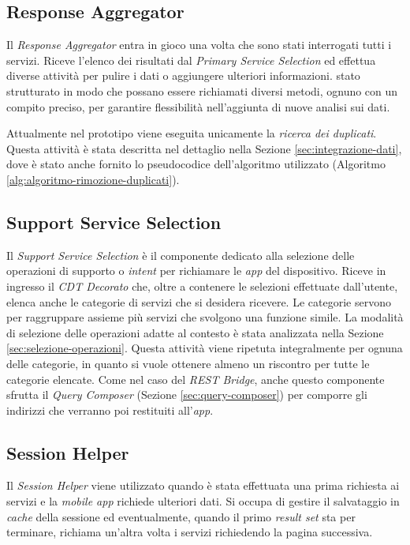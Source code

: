 \subsection{Response Aggregator\label{sec:response-aggregator}}

Il \emph{Response Aggregator} entra in gioco una volta che sono stati interrogati tutti i servizi. Riceve l'elenco dei risultati dal \emph{Primary Service Selection} ed effettua diverse attività per pulire i dati o aggiungere ulteriori informazioni. \upe stato strutturato in modo che possano essere richiamati diversi metodi, ognuno con un compito preciso, per garantire flessibilità nell'aggiunta di nuove analisi sui dati.

Attualmente nel prototipo viene eseguita unicamente la \emph{ricerca dei duplicati}. Questa attività è stata descritta nel dettaglio nella Sezione \ref{sec:integrazione-dati}, dove è stato anche fornito lo pseudocodice dell'algoritmo utilizzato (Algoritmo \ref{alg:algoritmo-rimozione-duplicati}).

\subsection{Support Service Selection\label{sec:support-service-selection}}

Il \emph{Support Service Selection} è il componente dedicato alla selezione delle operazioni di supporto o \emph{intent} per richiamare le \emph{app} del dispositivo. Riceve in ingresso il \emph{CDT Decorato} che, oltre a contenere le selezioni effettuate dall'utente, elenca anche le categorie di servizi che si desidera ricevere. Le categorie servono per raggruppare assieme più servizi che svolgono una funzione simile. La modalità di selezione delle operazioni adatte al contesto è stata analizzata nella Sezione \ref{sec:selezione-operazioni}. Questa attività viene ripetuta integralmente per ognuna delle categorie, in quanto si vuole ottenere almeno un riscontro per tutte le categorie elencate. Come nel caso del \emph{REST Bridge}, anche questo componente sfrutta il \emph{Query Composer} (Sezione \ref{sec:query-composer}) per comporre gli indirizzi che verranno poi restituiti all'\emph{app}.

\subsection{Session Helper\label{sec:session-helper}}

Il \emph{Session Helper} viene utilizzato quando è stata effettuata una prima richiesta ai servizi e la \emph{mobile app} richiede ulteriori dati. Si occupa di gestire il salvataggio in \emph{cache} della sessione ed eventualmente, quando il primo \emph{result set} sta per terminare, richiama un'altra volta i servizi richiedendo la pagina successiva.


